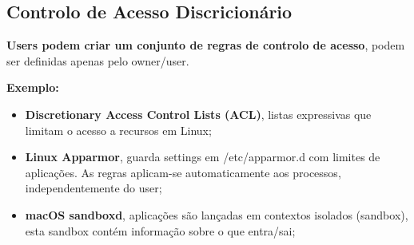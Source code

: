 \documentclass{article}
\begin{document}
\pagebreak

\subsection{Controlo de Acesso Discricionário}

\begin{flushleft}
  \textbf{Users podem criar um conjunto de regras de controlo de acesso},
  podem ser definidas apenas pelo owner/user.

  \vspace{2mm}

  \textbf{Exemplo:}

  \begin{itemize}
    \item \textbf{Discretionary Access Control Lists (ACL)}, listas expressivas que
    limitam o acesso a recursos em Linux;
    \item \textbf{Linux Apparmor}, guarda settings em /etc/apparmor.d com limites de
    aplicações. As regras aplicam-se automaticamente aos processos, independentemente
    do user;
    \item \textbf{macOS sandboxd}, aplicações são lançadas em contextos isolados (sandbox),
    esta sandbox contém informação sobre o que entra/sai;
  \end{itemize}
\end{flushleft}
\end{document}
